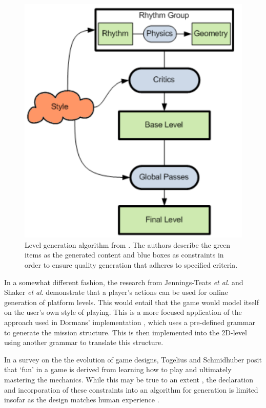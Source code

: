 \documentclass[11pt, a4paper, oneside]{report} %
\begin{document}
\begin{figure}[h!]

  \centering     \includegraphics[scale=0.35]{lvlgen}      \caption{Level generation algorithm from
\cite{Smith:2009:RLG:1536513.1536548}. The authors describe the green items as the generated content
and blue boxes as constraints in order to ensure quality generation that adheres to specified
criteria.}  \label{level2} \end{figure}

In a somewhat different fashion, the research from Jennings-Teats \textit{et
al}. \cite{jennings2010polymorph} and Shaker \textit{et al}.
\cite{shaker2010towards} demonstrate that a player's actions can be used for
online generation of platform levels. This would entail that the game would
model itself on the user's own style of playing. This is a more focused
application of the approach used in Dormans' implementation
\cite{dormans2010adventures}, which uses a pre-defined grammar to generate the
mission structure. This is then implemented into the 2D-level using another
grammar to translate this structure.

In a survey on the the evolution of game designs, Togelius and Schmidhuber
\cite{5035629} posit that `fun' in a game is derived from learning how to play
and ultimately mastering the mechanics. While this may be true to an extent
\cite{Burgun:2012}, the declaration and incorporation of these constraints into
an algorithm for generation is limited insofar as the design matches human
experience \cite{sorenson2011generic}.
\end{document}
